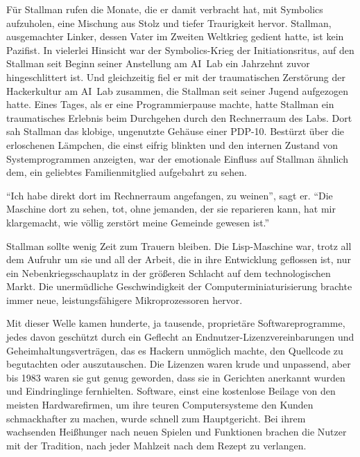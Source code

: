 Für Stallman rufen die Monate, die er damit verbracht hat, mit Symbolics aufzuholen, eine Mischung aus Stolz und tiefer Traurigkeit hervor. Stallman, ausgemachter Linker, dessen Vater im Zweiten Weltkrieg gedient hatte, ist kein Pazifist. In vielerlei Hinsicht war der Symbolics-Krieg der Initiationsritus, auf den Stallman seit Beginn seiner Anstellung am AI~Lab ein Jahrzehnt zuvor hingeschlittert ist. Und gleichzeitig fiel er mit der traumatischen Zerstörung der Hackerkultur am AI~Lab zusammen, die Stallman seit seiner Jugend aufgezogen hatte. Eines Tages, als er eine Programmierpause machte, hatte Stallman ein traumatisches Erlebnis beim Durchgehen durch den Rechnerraum des Labs. Dort sah Stallman das klobige, ungenutzte Gehäuse einer PDP-10. Bestürzt über die erloschenen Lämpchen, die einst eifrig blinkten und den internen Zustand von Systemprogrammen anzeigten, war der emotionale Einfluss auf Stallman ähnlich dem, ein geliebtes Familienmitglied aufgebahrt zu sehen.

"`Ich habe direkt dort im Rechnerraum angefangen, zu weinen"', sagt er. "`Die Maschine dort zu sehen, tot, ohne jemanden, der sie reparieren kann, hat mir klargemacht, wie völlig zerstört meine Gemeinde gewesen ist."'

Stallman sollte wenig Zeit zum Trauern bleiben. Die Lisp-Maschine war, trotz all dem Aufruhr um sie und all der Arbeit, die in ihre Entwicklung geflossen ist, nur ein Nebenkriegsschauplatz in der größeren Schlacht auf dem technologischen Markt. Die unermüdliche Geschwindigkeit der Computerminiaturisierung brachte immer neue, leistungsfähigere Mikroprozessoren hervor.

Mit dieser Welle kamen hunderte, ja tausende, proprietäre Softwareprogramme, jedes davon geschützt durch ein Geflecht an Endnutzer-Lizenzvereinbarungen und Geheimhaltungsverträgen, das es Hackern unmöglich machte, den Quellcode zu begutachten oder auszutauschen. Die Lizenzen waren krude und unpassend, aber bis 1983 waren sie gut genug geworden, dass sie in Gerichten anerkannt wurden und Eindringlinge fernhielten. Software, einst eine kostenlose Beilage von den meisten Hardwarefirmen, um ihre teuren Computersysteme den Kunden schmackhafter zu machen, wurde schnell zum Hauptgericht. Bei ihrem wachsenden Heißhunger nach neuen Spielen und Funktionen brachen die Nutzer mit der Tradition, nach jeder Mahlzeit nach dem Rezept zu verlangen.

